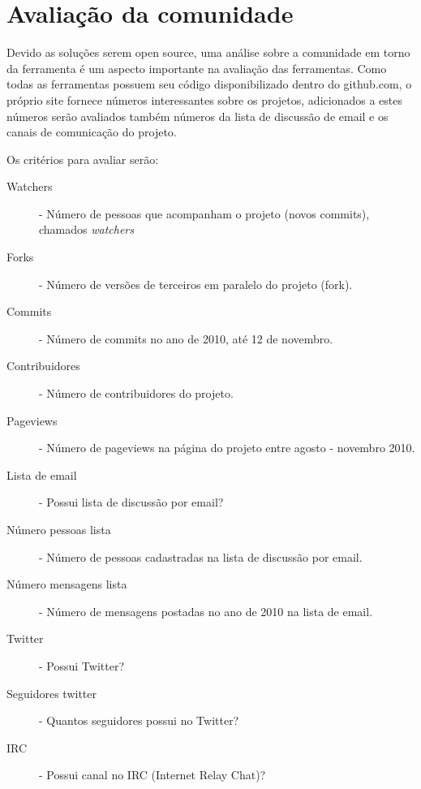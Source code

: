 \section{Avaliação da comunidade}

Devido as soluções serem open source, uma análise sobre a comunidade em torno da ferramenta é um aspecto importante na avaliação das ferramentas. Como todas as ferramentas possuem seu código disponibilizado dentro do github.com, o próprio site fornece números interessantes sobre os projetos, adicionados a estes números serão avaliados também números da lista de discussão de email e os canais de comunicação do projeto.

Os critérios para avaliar serão:

\begin{description}
    \item[Watchers] - Número de pessoas que acompanham o projeto (novos commits), chamados \emph{watchers}
    \item[Forks] - Número de versões de terceiros em paralelo do projeto (fork).
    \item[Commits] - Número de commits no ano de 2010, até 12 de novembro.
    \item[Contribuidores] - Número de contribuidores do projeto.
    \item[Pageviews] - Número de pageviews na página do projeto entre agosto - novembro 2010.
    \item[Lista de email] - Possui lista de discussão por email?
    \item[Número pessoas lista] - Número de pessoas cadastradas na lista de discussão por email. 
    \item[Número mensagens lista] - Número de mensagens postadas no ano de 2010 na lista de email.
    \item[Twitter] - Possui Twitter?
    \item[Seguidores twitter] - Quantos seguidores possui no Twitter?
    \item[IRC] - Possui canal no IRC (Internet Relay Chat)?
\end{description}



